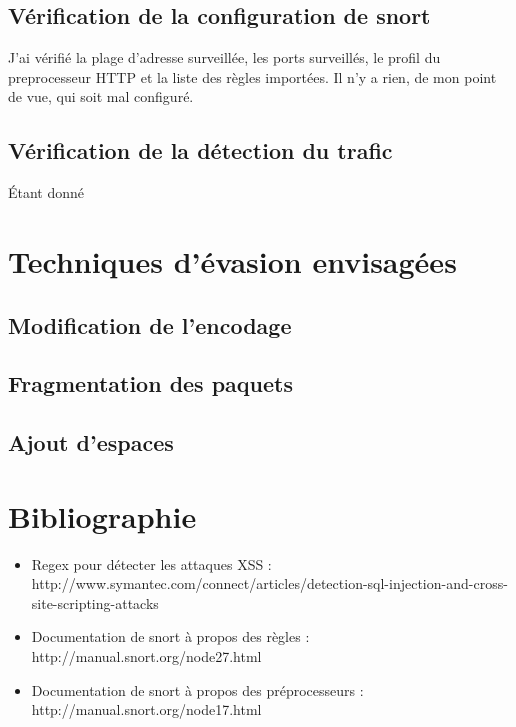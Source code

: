 \documentclass[oneside,10pt]{article}
\begin{document}
\subsection{V\'erification de la configuration de snort}
J'ai v\'erifi\'e la plage d'adresse surveill\'ee, les ports surveill\'es, le profil du preprocesseur HTTP et la liste des r\`egles import\'ees.
Il n'y a rien, de mon point de vue, qui soit mal configur\'e.

\subsection{V\'erification de la d\'etection du trafic}
\'Etant donn\'e 

\section{Techniques d'\'evasion envisag\'ees}
\subsection{Modification de l'encodage}
\subsection{Fragmentation des paquets}
\subsection{Ajout d'espaces}

\section{Bibliographie}
\begin{itemize}
\item Regex pour d\'etecter les attaques XSS :\\
http://www.symantec.com/connect/articles/detection-sql-injection-and-cross-site-scripting-attacks
\item Documentation de snort \`a propos des r\`egles :\\
http://manual.snort.org/node27.html
\item Documentation de snort \`a propos des pr\'eprocesseurs :\\
http://manual.snort.org/node17.html
\end{itemize}
\end{document}
